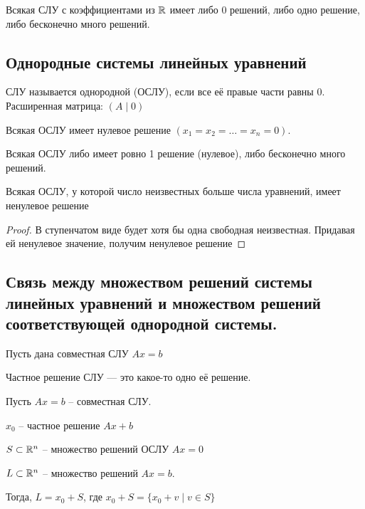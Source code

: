 \begin{corollary}
    Всякая СЛУ с коэффициентами из $\mathbb{R}$ имеет либо 0 решений, либо одно решение, либо бесконечно много решений.
\end{corollary}


\subsection{Однородные системы линейных уравнений}
\begin{definition}
    СЛУ называется однородной (ОСЛУ), если все её правые части равны 0. Расширенная матрица: $(A \mid 0)$
\end{definition}

\begin{fact}
    Всякая ОСЛУ имеет нулевое решение $(x_1 = x_2 = \dots = x_n = 0)$.
\end{fact}

\begin{corollary}
    Всякая ОСЛУ либо имеет ровно 1 решение (нулевое), либо бесконечно много решений.
\end{corollary}

\begin{corollary}
    Всякая ОСЛУ, у которой число неизвестных больше числа уравнений, имеет ненулевое решение
\end{corollary}

\begin{proof}
    В ступенчатом виде будет хотя бы одна свободная неизвестная. Придавая ей ненулевое значение, получим ненулевое решение
\end{proof}


\subsection{Связь между множеством решений системы линейных уравнений и множеством решений соответствующей однородной системы.}

Пусть дана совместная СЛУ $Ax = b$

Частное решение СЛУ --- это какое-то одно её решение.

\begin{proposition}
    Пусть $Ax = b$ -- совместная СЛУ.

    $x_0$ -- частное решение $Ax + b$

    $S \subset \mathbb{R}^n$ -- множество решений ОСЛУ $Ax = 0$

    $L \subset \mathbb{R}^n $ -- множество решений $Ax = b$.

    Тогда, $L = x_0 + S$, где $x_0 + S = \{x_0 + v \mid v \in S\}$
\end{proposition}

